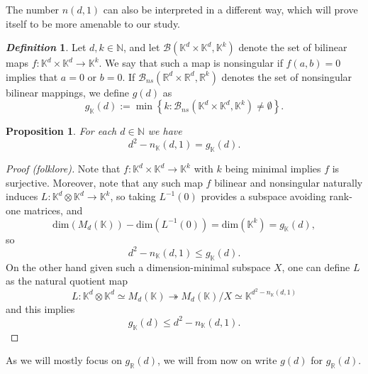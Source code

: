 \documentclass[11pt, a4paper, reqno]{elsarticle}
\newtheorem{proposition}{Proposition}[section]
\theoremstyle{definition}
\newtheorem{definition}{\textsl{Definition}}
\theoremstyle{remark}
\begin{document}
The number $n(d,1)$ can also be interpreted in a different
way, which will prove itself to be more amenable to our study.
\begin{definition}
Let $d,k\in \mathbb N$, and let 
$\mathcal B(\mathbb K^d\times \mathbb K^d, \mathbb K^k)$
denote the set of bilinear maps $f\colon\mathbb K^d\times \mathbb K^d\to \mathbb K^k$.
We say  that such a map is nonsingular
if $f(a,b)=0$ implies that 
$a=0$ or $b=0$.
If $\mathcal B_{ns}(\mathbb{R}^d\times 
\mathbb{R}^d,\mathbb R^k)$ denotes the
set of nonsingular bilinear mappings, 
we define $g(d)$ as
\begin{equation*}
	g_{\mathbb K}(d)
:=
	\min
	\left\{
		k\colon 
		\mathcal B_{ns}(\mathbb K^d\times \mathbb K^d, \mathbb K^k)
	\neq
		\emptyset
	\right\}.
\end{equation*}
\end{definition}
\begin{proposition}
For each $d\in \mathbb{N}$ we have
\begin{equation*}
	d^2
-
	n_{\mathbb K}(d,1)
=
	g_{\mathbb K}(d).
    \end{equation*}
\end{proposition}
\begin{proof}[Proof (folklore)]
Note that $f\colon\mathbb K^d\times \mathbb K^d\to \mathbb K^k$
with $k$ being minimal implies $f$ is surjective.
Moreover, note that any such map $f$ bilinear and nonsingular
naturally induces
$L\colon \mathbb K^d\otimes \mathbb K^d\to \mathbb K^{k}$,
so taking $L^{-1}(0)$ provides a subspace
avoiding rank-one matrices, and 
\begin{equation*}
	\mathrm{dim}(M_d(\mathbb K))
-
	\mathrm{dim}(L^{-1}(0))
=
	\mathrm{dim}(\mathbb K^k)
=
	g_{\mathbb K}(d),
\end{equation*}
so 
\begin{equation*}
	d^2
-
	n_{\mathbb K}(d,1)
\le
	g_{\mathbb K}(d).
\end{equation*}
On the other hand given such a dimension-minimal subspace $X$,
one can define $L$ as the natural quotient map
\begin{equation*}
	L\colon 
	\mathbb K^d\otimes \mathbb K^d
\simeq
	M_d(\mathbb K)
\twoheadrightarrow
	M_d(\mathbb K)/X
\simeq
	\mathbb K^{d^2-n_{\mathbb K}(d,1)}
\end{equation*} 
and this implies
\begin{equation*}
	g_{\mathbb K}(d)
\le
	d^2
-
	n_{\mathbb K}(d,1).
\end{equation*}
 \end{proof}
 As we will mostly focus on $g_{\mathbb{R}}(d)$, we will from now on
 write $g(d)$ for $g_{\mathbb R}(d)$.
\end{document}
